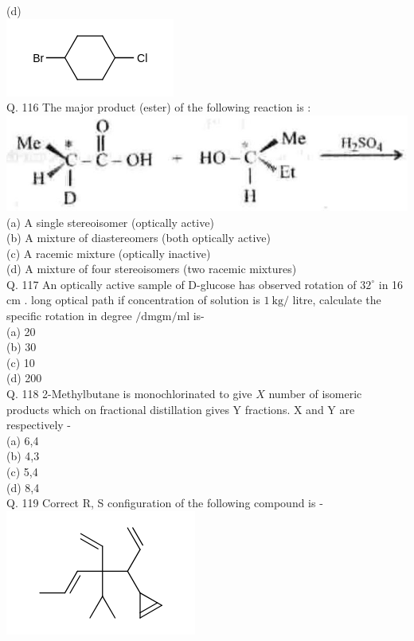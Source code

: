\documentclass[10pt]{article}
\begin{document}
(d)\\
\includegraphics{smile-927700e4f9e069f49e6f1db0984f94194cc28501}\\
Q. 116 The major product (ester) of the following reaction is :\\
\includegraphics[max width=\textwidth, center]{2025_01_28_8470952b98110cec3aabg-141(1)}\\
(a) A single stereoisomer (optically active)\\
(b) A mixture of diastereomers (both optically active)\\
(c) A racemic mixture (optically inactive)\\
(d) A mixture of four stereoisomers (two racemic mixtures)\\
Q. 117 An optically active sample of D-glucose has observed rotation of $32^{\circ}$ in 16 cm . long optical path if concentration of solution is $1 \mathrm{~kg} /$ litre, calculate the specific rotation in degree $/ \mathrm{dm} \mathrm{gm} / \mathrm{ml}$ is-\\
(a) 20\\
(b) 30\\
(c) 10\\
(d) 200\\
Q. 118 2-Methylbutane is monochlorinated to give $X$ number of isomeric products which on fractional distillation gives Y fractions. X and Y are respectively -\\
(a) 6,4\\
(b) 4,3\\
(c) 5,4\\
(d) 8,4\\
Q. 119 Correct R, S configuration of the following compound is -\\
\includegraphics{smile-b7dff9ac587cdee5826f27e65038adef3e62b0eb}\\
\end{document}
